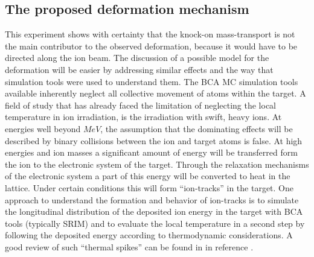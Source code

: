 \begin{Figure}[h]
\section{The proposed deformation mechanism}

This experiment shows with certainty that the knock-on mass-transport is not the main contributor to the observed deformation, because it would have to be directed along the ion beam. The discussion of a possible model for the deformation will be easier by addressing similar effects and the way that simulation tools were used to understand them. The BCA MC simulation tools available inherently neglect all collective movement of atoms within the target. A field of study that has already faced the limitation of neglecting the local temperature in ion irradiation, is the irradiation with swift, heavy ions. At energies well beyond $MeV$, the assumption that the dominating effects will be described by binary collisions between the ion and target atoms is false. At high energies and ion masses a significant amount of energy will be transferred form the ion to the electronic system of the target. Through the relaxation mechanisms of the electronic system a part of this energy will be converted to heat in the lattice. Under certain conditions this will form ``ion-tracks'' in the target. One approach to understand the formation and behavior of ion-tracks is to simulate the longitudinal distribution of the deposited ion energy in the target with BCA tools (typically SRIM) and to evaluate the local temperature in a second step by following the deposited energy according to thermodynamic considerations. A good review of such ``thermal spikes'' can be found in in reference \cite{wesch_effect_2004}. 


\end{Figure}
